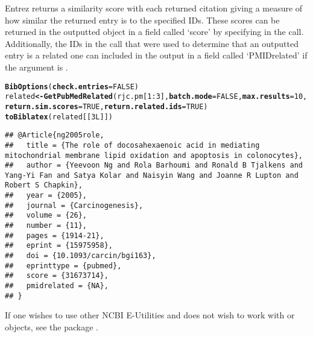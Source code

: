 \documentclass[article]{jss}\usepackage[]{graphicx}\usepackage[]{color}
\makeatletter
\newcommand{\hlnum}[1]{\textcolor[rgb]{0.125,0.125,1}{#1}}%
\newcommand{\hlopt}[1]{\textcolor[rgb]{0.251,0.251,0.282}{#1}}%
\newcommand{\hlstd}[1]{\textcolor[rgb]{0.251,0.251,0.282}{#1}}%
\newcommand{\hlkwb}[1]{\textcolor[rgb]{0.439,0.251,1}{\textbf{#1}}}%
\newcommand{\hlkwc}[1]{\textcolor[rgb]{0.529,0,0.184}{\textbf{#1}}}%
\newcommand{\hlkwd}[1]{\textcolor[rgb]{0.251,0.251,0.282}{\textbf{#1}}}%
\newenvironment{kframe}{%
 \def\at@end@of@kframe{}%
 \ifinner\ifhmode%
  \def\at@end@of@kframe{\end{minipage}}%
  \begin{minipage}{\columnwidth}%
 \fi\fi%
 \def\FrameCommand##1{\hskip\@totalleftmargin \hskip-\fboxsep
 \colorbox{shadecolor}{##1}\hskip-\fboxsep
     \hskip-\linewidth \hskip-\@totalleftmargin \hskip\columnwidth}%
 \MakeFramed {\advance\hsize-\width
   \@totalleftmargin\z@ \linewidth\hsize
   \@setminipage}}%
 {\par\unskip\endMakeFramed%
 \at@end@of@kframe}
\newenvironment{knitrout}{}{} %
\makeatother
\begin{document}
Entrez returns a similarity score with each returned citation giving a measure of how similar the returned entry is to the specified IDs.  These scores can be returned in the outputted  object in a field called `score' by specifying  in the call.  Additionally, the IDs in the call that were used to determine that an outputted entry is a related one can included in the output in a field called `PMIDrelated' if the argument  is .
\begin{knitrout}
\color{fgcolor}\begin{kframe}
\begin{alltt}
\hlkwd{BibOptions}\hlstd{(}\hlkwc{check.entries} \hlstd{=} \hlnum{FALSE}\hlstd{)}
\hlstd{related} \hlkwb{<-} \hlkwd{GetPubMedRelated}\hlstd{(rjc.pm[}\hlnum{1}\hlopt{:}\hlnum{3}\hlstd{],} \hlkwc{batch.mode} \hlstd{=} \hlnum{FALSE}\hlstd{,} \hlkwc{max.results} \hlstd{=} \hlnum{10}\hlstd{,}
    \hlkwc{return.sim.scores} \hlstd{=} \hlnum{TRUE}\hlstd{,} \hlkwc{return.related.ids} \hlstd{=} \hlnum{TRUE}\hlstd{)}
\hlkwd{toBiblatex}\hlstd{(related[[}\hlnum{3L}\hlstd{]])}
\end{alltt}
\begin{verbatim}
## @Article{ng2005role,
##   title = {The role of docosahexaenoic acid in mediating mitochondrial membrane lipid oxidation and apoptosis in colonocytes},
##   author = {Yeevoon Ng and Rola Barhoumi and Ronald B Tjalkens and Yang-Yi Fan and Satya Kolar and Naisyin Wang and Joanne R Lupton and Robert S Chapkin},
##   year = {2005},
##   journal = {Carcinogenesis},
##   volume = {26},
##   number = {11},
##   pages = {1914-21},
##   eprint = {15975958},
##   doi = {10.1093/carcin/bgi163},
##   eprinttype = {pubmed},
##   score = {31673714},
##   pmidrelated = {NA},
## }
\end{verbatim}
\end{kframe}
\end{knitrout}


If one wishes to use other NCBI E-Utilities and does not wish to work with  or  objects, see the  package \citep{rentrez}.
\end{document}

